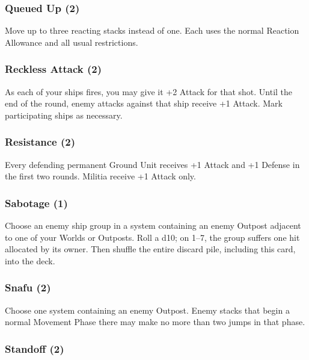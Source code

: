 \subsubsection{Queued Up (2)}

 Move up to three reacting stacks instead of one.
Each uses the normal Reaction Allowance and all usual restrictions.

\subsubsection{Reckless Attack (2)}

 As each of your ships fires, you
may give it +2 Attack for that shot. Until the end of the round, enemy attacks
against that ship receive +1 Attack. Mark participating ships as necessary.

\subsubsection{Resistance (2)}

 Every defending permanent
Ground Unit receives +1 Attack and +1 Defense in the first two rounds. Militia
receive +1 Attack only.

\subsubsection{Sabotage (1)}

 Choose an enemy ship group in a
system containing an enemy Outpost adjacent to one of your Worlds or Outposts.
Roll a d10; on 1--7, the group suffers one hit allocated by its owner. Then
shuffle the entire discard pile, including this card, into the deck.

\subsubsection{Snafu (2)}

 Choose one system containing an enemy
Outpost. Enemy stacks that begin a normal Movement Phase there may make no more
than two jumps in that phase.

\subsubsection{Standoff (2)}

